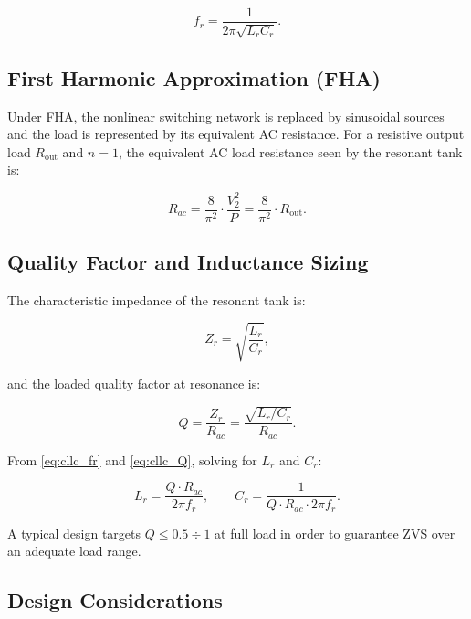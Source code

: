 \documentclass[a4paper, 11pt]{article}
\begin{document}
\begin{equation}
  f_r = \frac{1}{2\pi\sqrt{L_r C_r}}.
  \label{eq:cllc_fr}
\end{equation}

\subsection{First Harmonic Approximation (FHA)}

Under FHA, the nonlinear switching network is replaced by sinusoidal
sources and the load is represented by its equivalent AC resistance.
For a resistive output load $R_{\text{out}}$ and $n = 1$, the
equivalent AC load resistance seen by the resonant tank is:

\begin{equation}
  R_{ac} = \frac{8}{\pi^2} \cdot \frac{V_2^2}{P}
         = \frac{8}{\pi^2} \cdot R_{\text{out}}.
  \label{eq:cllc_rac}
\end{equation}

\subsection{Quality Factor and Inductance Sizing}

The characteristic impedance of the resonant tank is:

\begin{equation}
  Z_r = \sqrt{\frac{L_r}{C_r}},
  \label{eq:cllc_zr}
\end{equation}

and the loaded quality factor at resonance is:

\begin{equation}
  Q = \frac{Z_r}{R_{ac}} = \frac{\sqrt{L_r / C_r}}{R_{ac}}.
  \label{eq:cllc_Q}
\end{equation}

From \eqref{eq:cllc_fr} and \eqref{eq:cllc_Q}, solving for $L_r$ and
$C_r$:

\begin{equation}
  \boxed{L_r = \frac{Q \cdot R_{ac}}{2\pi f_r},}
  \qquad
  C_r = \frac{1}{Q \cdot R_{ac} \cdot 2\pi f_r}.
  \label{eq:cllc_LrCr}
\end{equation}

A typical design targets $Q \leq 0.5 \div 1$ at full load in order
to guarantee ZVS over an adequate load range.

\subsection{Design Considerations}
\end{document}
